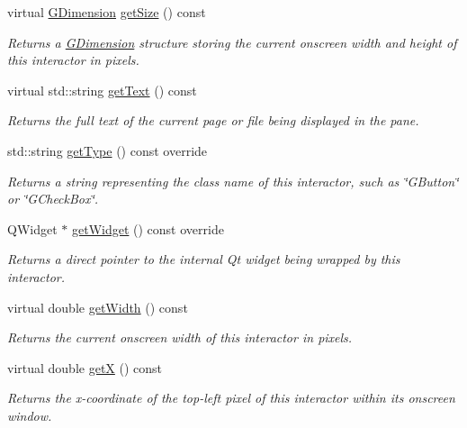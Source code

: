 \begin{DoxyCompactItemize}
virtual \mbox{\hyperlink{structGDimension}{G\+Dimension}} \mbox{\hyperlink{classGInteractor_a7b4eec96a2bdc6420695d5796a78eea9}{get\+Size}} () const
\begin{DoxyCompactList}\small\item\em Returns a \mbox{\hyperlink{structGDimension}{G\+Dimension}} structure storing the current onscreen width and height of this interactor in pixels. \end{DoxyCompactList}\item 
virtual std\+::string \mbox{\hyperlink{classGBrowserPane_aff553c50924b836c29f146ed34a7c6ec}{get\+Text}} () const
\begin{DoxyCompactList}\small\item\em Returns the full text of the current page or file being displayed in the pane. \end{DoxyCompactList}\item 
std\+::string \mbox{\hyperlink{classGBrowserPane_a9b72ede4ee8520f987a0c01e30654814}{get\+Type}} () const override
\begin{DoxyCompactList}\small\item\em Returns a string representing the class name of this interactor, such as \char`\"{}\+G\+Button\char`\"{} or \char`\"{}\+G\+Check\+Box\char`\"{}. \end{DoxyCompactList}\item 
Q\+Widget $\ast$ \mbox{\hyperlink{classGBrowserPane_a3b33a602b31a6b809d020535a59db3b4}{get\+Widget}} () const override
\begin{DoxyCompactList}\small\item\em Returns a direct pointer to the internal Qt widget being wrapped by this interactor. \end{DoxyCompactList}\item 
virtual double \mbox{\hyperlink{classGInteractor_a0ed2965abd4f5701d2cadf71239faf19}{get\+Width}} () const
\begin{DoxyCompactList}\small\item\em Returns the current onscreen width of this interactor in pixels. \end{DoxyCompactList}\item 
virtual double \mbox{\hyperlink{classGInteractor_a344385751bee0720059403940d57a13e}{getX}} () const
\begin{DoxyCompactList}\small\item\em Returns the x-\/coordinate of the top-\/left pixel of this interactor within its onscreen window. \end{DoxyCompactList}\item 

\end{DoxyCompactItemize}
